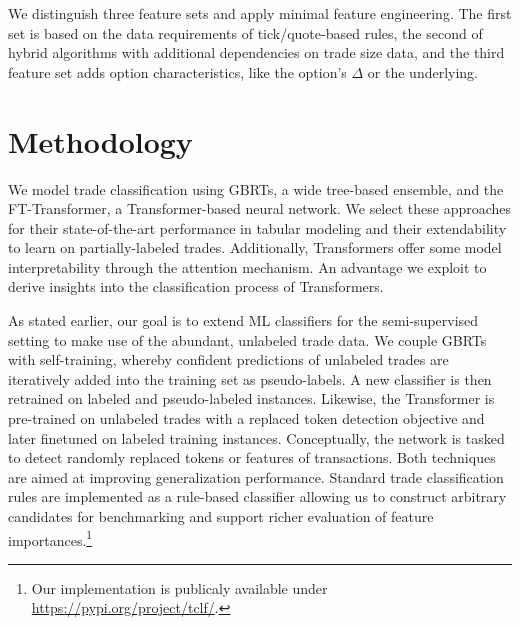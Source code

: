 \documentclass[oneside,a4paper,10pt]{article} %
\begin{document}
We distinguish three feature sets and apply minimal feature engineering. The first set is based on the data requirements of tick/quote-based rules, the second of hybrid algorithms with additional dependencies on trade size data, and the third feature set adds option characteristics, like the option's $\Delta$ or the underlying. 

\section{Methodology}

We model trade classification using \glspl{GBRT}, a wide tree-based ensemble, and the FT-Transformer, a Transformer-based neural network. 
We select these approaches for their state-of-the-art performance in tabular modeling \autocites[][]{gorishniyRevisitingDeepLearning2021}[][]{grinsztajnWhyTreebasedModels2022} and their extendability to learn on partially-labeled trades. Additionally, Transformers offer some model interpretability through the attention mechanism. An advantage we exploit to derive insights into the classification process of Transformers.

As stated earlier, our goal is to extend \gls{ML} classifiers for the semi-supervised setting to make use of the abundant, unlabeled trade data. We couple \glspl{GBRT} with self-training, whereby confident predictions of unlabeled trades are iteratively added into the training set as pseudo-labels.
A new classifier is then retrained on labeled and pseudo-labeled instances. Likewise, the Transformer is pre-trained on unlabeled trades with a replaced token detection objective and later finetuned on labeled training instances. Conceptually, the network is tasked to detect randomly replaced tokens or features of transactions. Both techniques are aimed at improving generalization performance. Standard trade classification rules are implemented as a rule-based classifier allowing us to construct arbitrary candidates for benchmarking and support richer evaluation of feature importances.\footnote{Our implementation is publicaly available under \url{https://pypi.org/project/tclf/}.}
\end{document}

